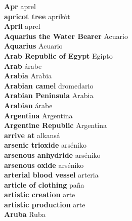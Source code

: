 \textbf{ Apr  } aprel \\
\textbf{ apricot tree  } aprikòt \\
\textbf{ April  } aprel \\
\textbf{ Aquarius the Water Bearer  } Acuario \\
\textbf{ Aquarius  } Acuario \\
\textbf{ Arab Republic of Egypt  } Egipto \\
\textbf{ Arab  } árabe \\
\textbf{ Arabia  } Arabia \\
\textbf{ Arabian camel  } dromedario \\
\textbf{ Arabian Peninsula  } Arabia \\
\textbf{ Arabian  } árabe \\
\textbf{ Argentina  } Argentina \\
\textbf{ Argentine Republic  } Argentina \\
\textbf{ arrive at  } alkansá \\
\textbf{ arsenic trioxide  } arséniko \\
\textbf{ arsenous anhydride  } arséniko \\
\textbf{ arsenous oxide  } arséniko \\
\textbf{ arterial blood vessel  } arteria \\
\textbf{ article of clothing  } paña \\
\textbf{ artistic creation  } arte \\
\textbf{ artistic production  } arte \\
\textbf{ Aruba  } Ruba \\

